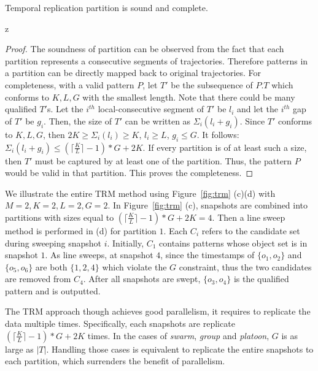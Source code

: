 \begin{theorem}
\label{thm:replication_partition}
Temporal replication partition is sound and complete.
\end{theorem}z
\begin{proof}
The soundness of partition can be observed from the fact 
that each partition represents a consecutive segments of trajectories. 
Therefore patterns in a partition can be directly mapped 
back to original trajectories. For completeness, with a
valid pattern $P$, let $T'$ be the subsequence of $P.T$ which conforms to $K,L,G$ 
with the smallest length. Note that there could be many qualified $T'$s. 
Let the $i^{th}$ local-consecutive segment of $T'$ be $l_i$ and 
let the $i^{th}$ gap of $T'$ be $g_i$. Then, the size of $T'$ can 
be written as $\Sigma_i (l_i + g_i)$.  Since $T'$ conforms to $K,L,G$, 
then $2K \geq \Sigma_i (l_i) \geq K$, $l_i \geq L$, $g_i \leq G$. 
It follows: $\Sigma_i(l_i+g_i) \leq (\lceil \frac{K}{L} \rceil -1) *G+2K$. 
If every partition is of at least such a size, then $T'$ must be
captured by at least one of the partition. Thus, the pattern $P$ would 
be valid in that partition. This proves the completeness.
\end{proof}

\begin{example}
We illustrate the entire TRM method using Figure~\ref{fig:trm} (c)(d) with $M=2, K=2, L = 2, G=2$. 
In Figure~\ref{fig:trm} (c), snapshots are combined into partitions with sizes equal to 
$(\lceil \frac{K}{L} \rceil-1) *G+2K = 4$. Then a line sweep method is performed in (d) 
for partition $1$. Each $C_i$ refers to the candidate set during sweeping snapshot $i$. 
Initially, $C_1$ contains patterns whose object set is in snapshot $1$.
As line sweeps, at snapshot $4$, since the timestamps of $\{o_1,o_2\}$ and $\{o_5,o_6\}$ 
are both $\{1,2,4\}$ which violate the $G$ constraint, 
thus the two candidates are removed from $C_4$. After all snapshots are swept, 
$\{o_3,o_4\}$ is the qualified pattern and is outputted.
\end{example}

The TRM approach though achieves good parallelism, 
it requires to replicate the data multiple times. 
Specifically, each snapshots are replicate $(\lceil \frac{K}{L} \rceil -1) *G+2K$ times. 
In the cases of \emph{swarm}, \emph{group} and \emph{platoon}, $G$ is as large as $|T|$. 
Handling those cases is equivalent to replicate the entire snapshots to each partition, 
which surrenders the benefit of parallelism.



